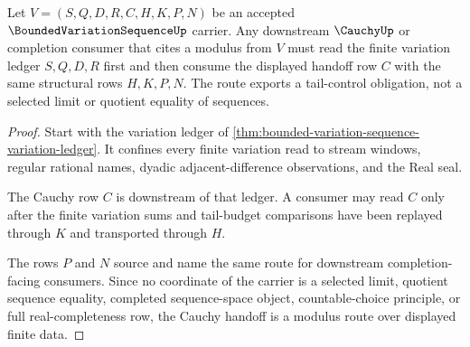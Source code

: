 \begin{theorem}
\label{thm:bounded-variation-sequence-cauchy-modulus-route}
Let $V=(S,Q,D,R,C,H,K,P,N)$ be an accepted $\BoundedVariationSequenceUp$ carrier. Any downstream $\CauchyUp$ or completion consumer that cites a modulus from $V$ must read the finite variation ledger $S,Q,D,R$ first and then consume the displayed handoff row $C$ with the same structural rows $H,K,P,N$. The route exports a tail-control obligation, not a selected limit or quotient equality of sequences.
\end{theorem}
\begin{proof}
Start with the variation ledger of \autoref{thm:bounded-variation-sequence-variation-ledger}. It confines every finite variation read to stream windows, regular rational names, dyadic adjacent-difference observations, and the Real seal.

The Cauchy row $C$ is downstream of that ledger. A consumer may read $C$ only after the finite variation sums and tail-budget comparisons have been replayed through $K$ and transported through $H$.

The rows $P$ and $N$ source and name the same route for downstream completion-facing consumers. Since no coordinate of the carrier is a selected limit, quotient sequence equality, completed sequence-space object, countable-choice principle, or full real-completeness row, the Cauchy handoff is a modulus route over displayed finite data.
\end{proof}




